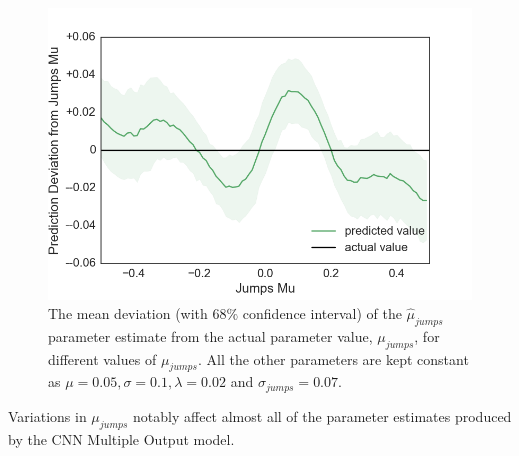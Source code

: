 \documentclass[11pt,oneside,openany,a4paper,english, report, goldenblock
]{usthesis}
\begin{document}
\begin{figure}[h]
	\centering
	\includegraphics[width=0.5\linewidth]{Images/Output-Sensitivity-Results/ConvolutionalNN-MultipleOutput-ELU/Varying-Jumps_mu/Jumps_Mu}
	\caption{The mean deviation (with $68\%$ confidence interval) of the $\hat{\mu}_{jumps}$ parameter estimate from the actual parameter value, $\mu_{jumps}$, for different values of $\mu_{jumps}$. All the other parameters are kept constant as $\mu = 0.05, \sigma = 0.1, \lambda = 0.02$ and $\sigma_{jumps} = 0.07$.}
	\label{fig:sensitivity_test:multiple_output:varying_jumps_mu:jumps_mu}
\end{figure}

Variations in $\mu_{jumps}$ notably affect almost all of the parameter estimates produced by the CNN Multiple Output model.
\end{document}
